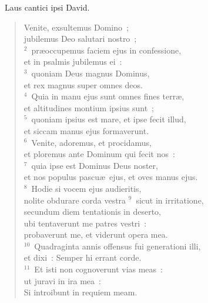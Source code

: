 ~\lettrine[lines=10,image=true,loversize=0.05,lraise=-0.03]{L}{}aus cantici ipsi David. \begin{flushleft}\begin{verse}\vspace{6pt}Venite, exsultemus Domino~;\\ jubilemus Deo salutari nostro~;\\
${}^{2}$~pr\ae occupemus faciem ejus in confessione,\\ et in psalmis jubilemus ei~:\\
${}^{3}$~quoniam Deus magnus Dominus,\\ et rex magnus super omnes deos.\\
${}^{4}$~Quia in manu ejus sunt omnes fines terr\ae ,\\ et altitudines montium ipsius sunt~;\\
${}^{5}$~quoniam ipsius est mare, et ipse fecit illud,\\ et siccam manus ejus formaverunt.\\
${}^{6}$~Venite, adoremus, et procidamus,\\ et ploremus ante Dominum qui fecit nos~:\\
${}^{7}$~quia ipse est Dominus Deus noster,\\ et nos populus pascu\ae\ ejus, et oves manus ejus.\\
${}^{8}$~Hodie si vocem ejus audieritis,\\ nolite obdurare corda vestra
${}^{9}$~sicut in irritatione,\\ secundum diem tentationis in deserto,\\ ubi tentaverunt me patres vestri~:\\ probaverunt me, et viderunt opera mea.\\
${}^{10}$~Quadraginta annis offensus fui generationi illi,\\ et dixi~: Semper hi errant corde.\\
${}^{11}$~Et isti non cognoverunt vias meas~:\\ ut juravi in ira mea~:\\ Si introibunt in requiem meam.\end{verse}\end{flushleft}


